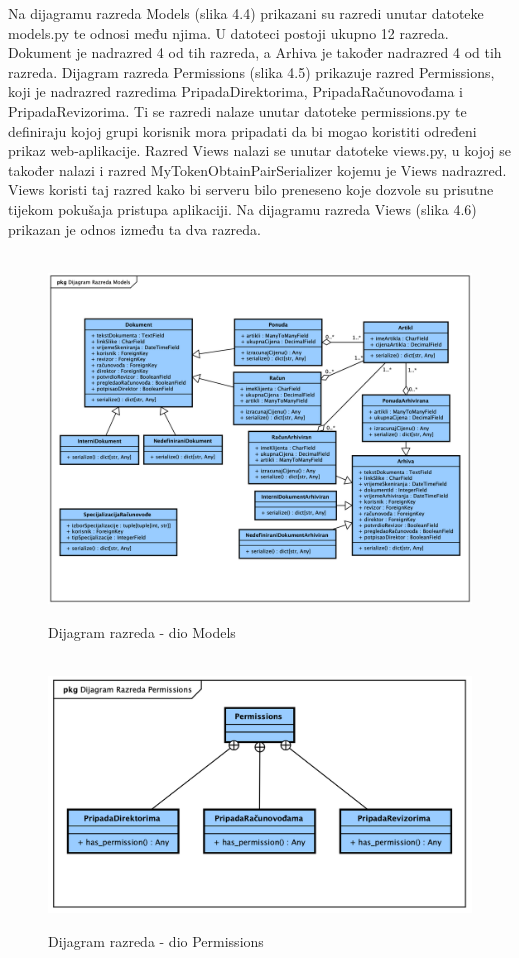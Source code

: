 			Na dijagramu razreda Models (slika 4.4) prikazani su razredi unutar datoteke models.py te
			odnosi među njima. U datoteci postoji ukupno 12 razreda. Dokument je nadrazred 4 od tih razreda, a Arhiva
			je također nadrazred 4 od tih razreda.
			\newline
			Dijagram razreda Permissions (slika 4.5) prikazuje razred Permissions,
			koji je nadrazred razredima PripadaDirektorima, PripadaRačunovođama i PripadaRevizorima. Ti se
			razredi nalaze unutar datoteke permissions.py te definiraju kojoj grupi korisnik mora pripadati
			da bi mogao koristiti određeni prikaz web-aplikacije.
			\newline
			Razred Views nalazi se unutar datoteke views.py, u kojoj se također nalazi i razred
			MyTokenObtainPairSerializer kojemu je Views nadrazred. Views koristi taj razred kako bi
			serveru bilo preneseno koje dozvole su prisutne tijekom pokušaja pristupa aplikaciji.
			Na dijagramu razreda Views (slika 4.6) prikazan je odnos između ta dva razreda. 
			
			\begin{figure}[H]
				\
				\includegraphics[width=\textwidth]{slike/Class_Models.png}
				\caption{Dijagram razreda - dio Models}
				\label{fig:class_models}
			\end{figure}

			\begin{figure}[H]
				\
				\includegraphics[width=\textwidth]{slike/Class_Permissions.png}
				\caption{Dijagram razreda - dio Permissions}
				\label{fig:class_permissions}
			\end{figure}

